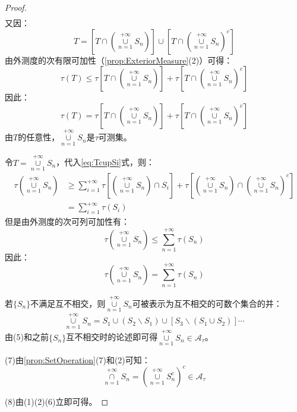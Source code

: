 \begin{proof}
\begin{align}
	\end{align}
	又因：
	\begin{equation*}
		T=\left[T\cap\left(\underset{n=1}{\overset{+\infty}{\cup}}S_n\right)\right]\cup\left[T\cap\left(\underset{n=1}{\overset{+\infty}{\cup}}S_n\right)^c\right]
	\end{equation*}
	由外测度的次有限可加性（\cref{prop:ExteriorMeasure}(2)）可得：
	\begin{equation*}
		\tau(T)\leqslant \tau\left[T\cap\left(\underset{n=1}{\overset{+\infty}{\cup}}S_n\right)\right]+\tau\left[T\cap\left(\underset{n=1}{\overset{+\infty}{\cup}}S_n\right)^c\right]
	\end{equation*}
	因此：
	\begin{equation*}
		\tau(T)= \tau\left[T\cap\left(\underset{n=1}{\overset{+\infty}{\cup}}S_n\right)\right]+\tau\left[T\cap\left(\underset{n=1}{\overset{+\infty}{\cup}}S_n\right)^c\right]
	\end{equation*}
	由$T$的任意性，$\underset{n=1}{\overset{+\infty}{\cup}}S_n$是$\tau$可测集。\par
	令$T=\underset{n=1}{\overset{+\infty}{\cup}}S_n$，代入\cref{eq:TcupSi}式，则：
	\begin{align*}
		\tau\left(\underset{n=1}{\overset{+\infty}{\cup}}S_n\right)
		&\geqslant\sum_{i=1}^{+\infty} \tau\left[\left(\underset{n=1}{\overset{+\infty}{\cup}}S_n\right)\cap S_i\right]+\tau\left[\left(\underset{n=1}{\overset{+\infty}{\cup}}S_n\right)\cap\left(\underset{n=1}{\overset{+\infty}{\cup}}S_n\right)^c\right] \\
		&=\sum_{i=1}^{+\infty} \tau(S_i)
	\end{align*}
	但是由外测度的次可列可加性有：
	\begin{equation*}
		\tau\left(\underset{n=1}{\overset{+\infty}{\cup}}S_n\right)\leqslant\sum_{n=1}^{+\infty} \tau(S_n)
	\end{equation*}
	因此：
	\begin{equation*}
		\tau\left(\underset{n=1}{\overset{+\infty}{\cup}}S_n\right)=\sum_{n=1}^{+\infty} \tau(S_n)
	\end{equation*}\par
	若$\{S_n\}$不满足互不相交，则$\underset{n=1}{\overset{+\infty}{\cup}}S_n$可被表示为互不相交的可数个集合的并：
	\begin{equation*}
		\underset{n=1}{\overset{+\infty}{\cup}}S_n=S_1\cup (S_2\backslash S_1)\cup[S_3\backslash(S_1\cup S_2)]\cdots
	\end{equation*}
	由(5)和之前$\{S_n\}$互不相交时的论述即可得$\underset{n=1}{\overset{+\infty}{\cup}}S_n\in \mathscr{A}_{\tau}$。\par
	(7)由\cref{prop:SetOperation}(7)和(2)可知：
	\begin{equation*}
		\underset{n=1}{\overset{+\infty}{\cap}}S_n=\left(\underset{n=1}{\overset{+\infty}{\cup}}S_n^c\right)^c\in \mathscr{A}_{\tau}
	\end{equation*}\par
	(8)由(1)(2)(6)立即可得。
\end{proof}

